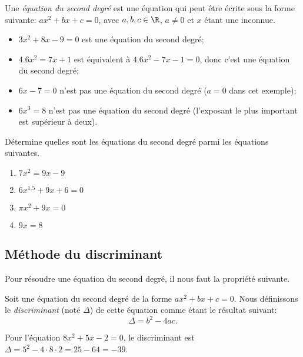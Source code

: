 \begin{definition}
    Une \emph{équation du second degré} est une équation qui peut être écrite sous la forme suivante: $ax^2 + bx + c = 0$, avec $a,b,c\in \R$, $a\not=0$ et $x$ étant une inconnue.
\end{definition}

\begin{exemple}
    \begin{itemize}
        \item $3x^2 + 8x -9 = 0$ est une équation du second degré;
        \item $4.6 x^2 = 7x + 1$ est équivalent à $4.6x^2 - 7x - 1 = 0$, donc c'est une équation du second degré;
        \item $6x - 7 = 0$ n'est pas une équation du second degré ($a = 0$ dans cet exemple);
        \item $6x^3 = 8$ n'est pas une équation du second degré (l'exposant le plus important est supérieur à deux).
    \end{itemize}
\end{exemple}

\begin{exercice}
    Détermine quelles sont les équations du second degré parmi les équations suivantes.
    \begin{enumerate}
        \item $7x^2 = 9x - 9$
        \item $6x^{1.5} + 9x + 6 =0$
        \item $\pi x^2 + 9x = 0$
        \item $9x = 8$
    \end{enumerate}
\end{exercice}

\subsection{Méthode du discriminant}

Pour résoudre une équation du second degré, il nous faut la propriété suivante.

\begin{definition}
    Soit une équation du second degré de la forme $ax^2 + bx + c = 0$. Nous définissons le \emph{discriminant} (noté $\Delta$) de cette équation comme étant le résultat suivant:
    \[
        \Delta = b^2 - 4ac.
    \]
\end{definition}

\begin{exemple}
    Pour l'équation $8x^2 + 5x - 2 = 0$, le discriminant est $\Delta = 5^2 - 4\cdot 8 \cdot 2 = 25 - 64 = -39$.
\end{exemple}

